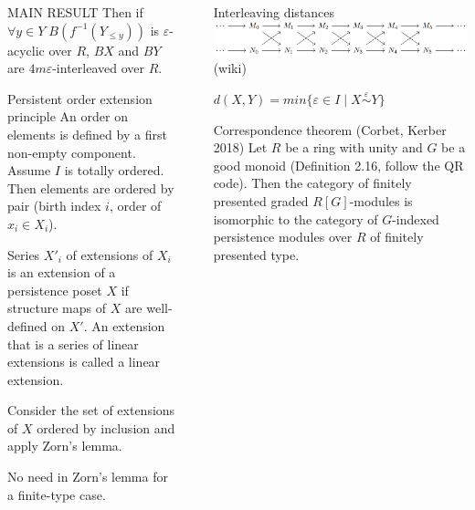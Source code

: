 \documentclass[usenames,dvipsnames]{beamer}
\begin{document}
\begin{frame}{}
\begin{columns}[t]
\begin{column}{.38\linewidth}
\begin{block}{\large MAIN RESULT}
          Then if $\forall y \in Y\;B(f^{-1}(Y_{\leqslant y}))$ is $\varepsilon$-acyclic over $R$, $BX$ and $BY$ are $4m\varepsilon$-interleaved over $R$.
        \end{block}
        \begin{block}{Persistent order extension principle}
          An order on elements is defined by a first non-empty component. Assume $I$ is totally ordered. Then elements are ordered by pair (birth index $i$, order of $x_i \in X_i$).\par
          \vspace{0.1cm}
          Series $X'_i$ of extensions of $X_i$ is an extension of a persistence poset $X$ if structure maps of $X$ are well-defined on $X'$. An extension that is a series of linear extensions is called a linear extension.\par
          \vspace{0.1cm}
          Consider the set of extensions of $X$ ordered by inclusion and apply Zorn's lemma.\par
          No need in Zorn's lemma for a finite-type case.
        \end{block}
      \end{column}
      \begin{column}{0.0001\linewidth}
          \begin{center}
          \rule{2pt}{0.4\textheight}
          \end{center}
      \end{column}
      \begin{column}{.38\linewidth}
        \begin{block}{Interleaving distances}
          \includegraphics[scale=0.45]{wiki_interleaving.png} (wiki)\par
          $d(X,Y) = min\{\varepsilon \in I\;|\;X \stackrel{\varepsilon}{\sim} Y\}$
        \end{block}
        \begin{block}{Correspondence theorem (Corbet, Kerber 2018)}
          Let $R$ be a ring with unity and $G$ be a good monoid (Definition 2.16, follow the QR code). Then the category of finitely presented graded $R[G]$-modules is isomorphic to the category of $G$-indexed persistence modules over $R$ of finitely presented type.
        \end{block}

\end{column}
\end{columns}
\end{frame}
\end{document}
